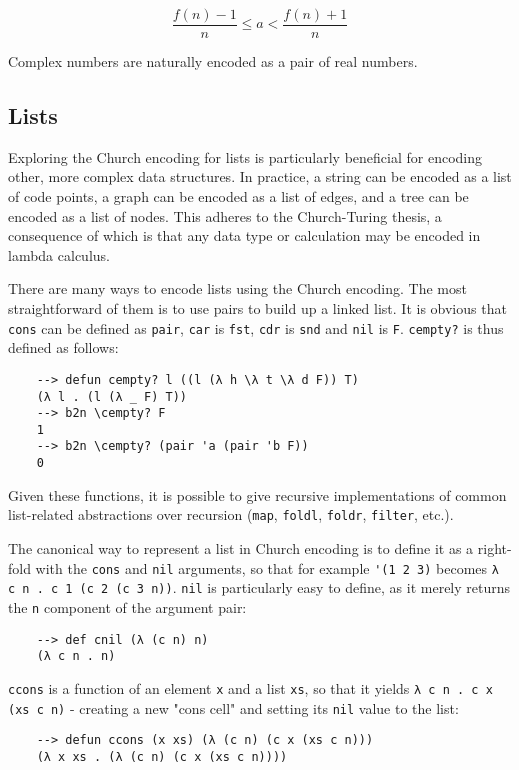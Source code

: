 $$ \frac{f(n) - 1}{n} \le a < \frac{f(n) + 1}{n} $$

Complex numbers are naturally encoded as a pair of real numbers.

\subsection{Lists}

Exploring the Church encoding for lists is particularly beneficial for encoding other, more complex data structures. In practice, a string can be encoded as a list of code points, a graph can be encoded as a list of edges, and a tree can be encoded as a list of nodes. This adheres to the Church-Turing thesis, a consequence of which is that any data type or calculation may be encoded in lambda calculus.

There are many ways to encode lists using the Church encoding. The most straightforward of them is to use pairs to build up a linked list. It is obvious that \verb|cons| can be defined as \verb|pair|, \verb|car| is \verb|fst|, \verb|cdr| is \verb|snd| and \verb|nil| is \verb|F|. \verb|cempty?| is thus defined as follows:

\begin{Verbatim}
    --> defun cempty? l ((l (λ h \λ t \λ d F)) T)
    (λ l . (l (λ _ F) T))
    --> b2n \cempty? F
    1
    --> b2n \cempty? (pair 'a (pair 'b F))
    0
\end{Verbatim}

Given these functions, it is possible to give recursive implementations of common list-related abstractions over recursion (\verb|map|, \verb|foldl|, \verb|foldr|, \verb|filter|, etc.).

The canonical way to represent a list in Church encoding is to define it as a right-fold with the \verb|cons| and \verb|nil| arguments, so that for example \verb|'(1 2 3)| becomes \verb|λ c n . c 1 (c 2 (c 3 n))|. \verb|nil| is particularly easy to define, as it merely returns the \verb|n| component of the argument pair:

\begin{Verbatim}
    --> def cnil (λ (c n) n)
    (λ c n . n)
\end{Verbatim}

\verb|ccons| is a function of an element \verb|x| and a list \verb|xs|, so that it yields \verb|λ c n . c x (xs c n)| - creating a new "cons cell" and setting its \verb|nil| value to the list:

\begin{Verbatim}
    --> defun ccons (x xs) (λ (c n) (c x (xs c n)))
    (λ x xs . (λ (c n) (c x (xs c n))))
\end{Verbatim}

